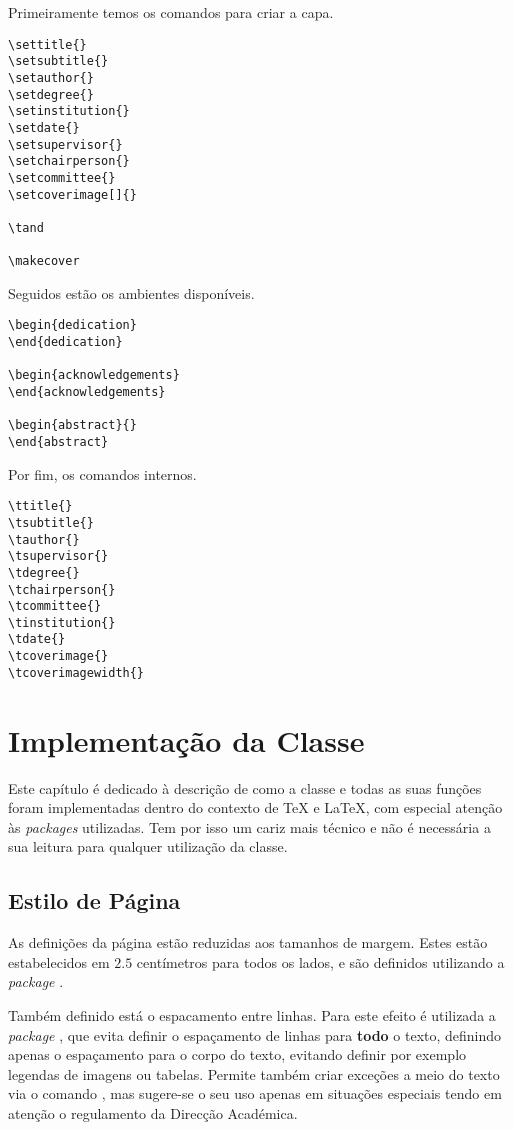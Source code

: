 \documentclass{../ist-thesis}
\begin{document}
Primeiramente temos os comandos para criar a capa.
\begin{verbatim}
\settitle{}
\setsubtitle{}
\setauthor{}
\setdegree{}
\setinstitution{}
\setdate{}
\setsupervisor{}
\setchairperson{}
\setcommittee{}
\setcoverimage[]{}

\tand

\makecover
\end{verbatim}

Seguidos estão os ambientes disponíveis.
\begin{verbatim}
\begin{dedication}
\end{dedication}

\begin{acknowledgements}
\end{acknowledgements}

\begin{abstract}{}
\end{abstract}
\end{verbatim}

Por fim, os comandos internos.
\begin{verbatim}
\ttitle{}
\tsubtitle{}
\tauthor{}
\tsupervisor{}
\tdegree{}
\tchairperson{}
\tcommittee{}
\tinstitution{}
\tdate{}
\tcoverimage{}
\tcoverimagewidth{}
\end{verbatim}

\chapter{Implementação da Classe}

Este capítulo é dedicado à descrição de como a classe e todas as suas funções foram implementadas dentro do contexto de \TeX{} e \LaTeX{}, com especial atenção às \textit{packages} utilizadas. Tem por isso um cariz mais técnico e não é necessária a sua leitura para qualquer utilização da classe.

\section{Estilo de Página}

As definições da página estão reduzidas aos tamanhos de margem. Estes estão estabelecidos em $2.5$ centímetros para todos os lados, e são definidos utilizando a \textit{package} .

Também definido está o espacamento entre linhas. Para este efeito é utilizada a \textit{package} , que evita definir o espaçamento de linhas para \textbf{todo} o texto, definindo apenas o espaçamento para o corpo do texto, evitando definir por exemplo legendas de imagens ou tabelas. Permite também criar exceções a meio do texto via o comando \texttt{\setspace}, mas sugere-se o seu uso apenas em situações especiais tendo em atenção o regulamento da Direcção Académica.
\end{document}
